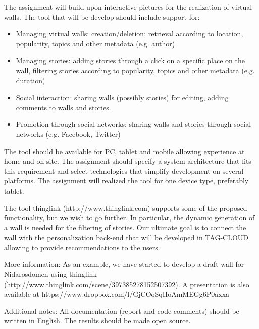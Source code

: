 \documentclass[11pt]{book}
\begin{document}
The assignment will build upon interactive pictures for the realization of virtual walls. The tool that will be develop should include support for:
\begin{itemize}
    \item Managing virtual walls: creation/deletion; retrieval according to location, popularity, topics and other metadata (e.g. author)
    \item Managing stories: adding stories through a click on a specific place on the wall, filtering stories
according to popularity, topics and other metadata (e.g. duration)
    \item Social interaction: sharing walls (possibly stories) for editing, adding comments to walls and stories.
    \item Promotion through social networks: sharing walls and stories through social networks (e.g. Facebook, Twitter)
\end{itemize}
The tool should be available for PC, tablet and mobile allowing experience at home and on site. The assignment should specify a system architecture that fits this requirement and select technologies that simplify development on several platforms. The assignment will realized the tool for one device type, preferably tablet.

The tool thinglink (http://www.thinglink.com) supports some of the proposed functionality, but we wish to go further. In particular, the dynamic generation of a wall is needed for the filtering of stories. Our ultimate goal is to connect the wall with the personalization back-end that will be developed in TAG-CLOUD allowing to provide recommendations to the users.

More information: As an example, we have started to develop a draft wall for Nidarosdomen using thinglink (http://www.thinglink.com/scene/397385278152507392). A presentation is also available at https://www.dropbox.com/l/GjCOoSqHoAmMEGg6P0axxa

Additional notes: All documentation (report and code comments) should be written in English. The results should be made open source.
\end{document}
